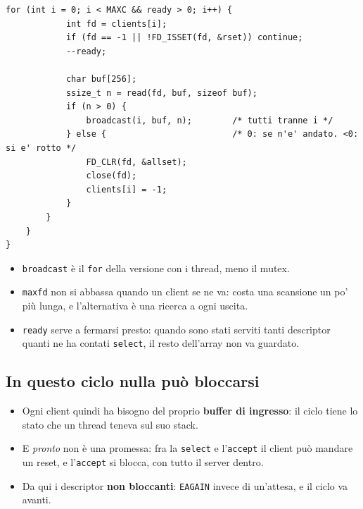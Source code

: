 \begin{lstlisting}[language={[POSIX]C}, style=wnumbers, title={Servire le connessioni pronte}]
        for (int i = 0; i < MAXC && ready > 0; i++) {
            int fd = clients[i];
            if (fd == -1 || !FD_ISSET(fd, &rset)) continue;
            --ready;

            char buf[256];
            ssize_t n = read(fd, buf, sizeof buf);
            if (n > 0) {
                broadcast(i, buf, n);        /* tutti tranne i */
            } else {                         /* 0: se n'e' andato. <0: si e' rotto */
                FD_CLR(fd, &allset);
                close(fd);
                clients[i] = -1;
            }
        }
    }
}
\end{lstlisting}

\begin{itemize}
    \item \texttt{broadcast} è il \texttt{for} della versione con i thread, meno il mutex.
    \item \texttt{maxfd} non si abbassa quando un client se ne va: costa una scansione un po' più lunga, e l'alternativa è
          una ricerca a ogni uscita.
    \item \texttt{ready} serve a fermarsi presto: quando sono stati serviti tanti descriptor quanti ne ha contati
          \texttt{select}, il resto dell'array non va guardato.
\end{itemize}

\subsection{In questo ciclo nulla può bloccarsi}


\begin{itemize}
    \item Ogni client quindi ha bisogno del proprio \textbf{buffer di ingresso}: il ciclo tiene lo stato che un thread teneva
          sul suo stack.
    \item E \emph{pronto} non è una promessa: fra la \texttt{select} e l'\texttt{accept} il client può mandare un reset, e
          l'\texttt{accept} si blocca, con tutto il server dentro.
    \item Da qui i descriptor \textbf{non bloccanti}: \texttt{EAGAIN} invece di un'attesa, e il ciclo va avanti.
\end{itemize}

